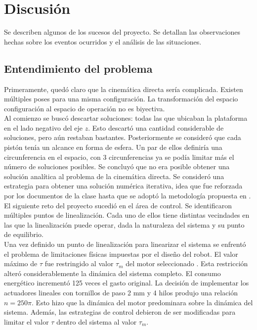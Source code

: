 \section{Discusión}
Se describen algunos de los sucesos del proyecto.
Se detallan las observaciones hechas sobre los eventos ocurridos y
el análisis de las situaciones.

\subsection{Entendimiento del problema}
Primeramente, quedó claro que la cinemática directa sería complicada. Existen múltiples poses para una misma configuración. 
La transformación del espacio configuración al espacio de operación no es biyectiva.\\

Al comienzo se buscó descartar soluciones: todas las que ubicaban la plataforma en el lado negativo del eje $z$. 
Esto descartó una cantidad considerable de soluciones, pero aún restaban bastantes.
Posteriormente se consideró que cada pistón tenía un alcance en forma de esfera.
Un par de ellos definiría una circunferencia en el espacio, con 3 circunferencias ya se podía limitar más el número de soluciones posibles.
Se concluyó que no era posible obtener una solución analítica al problema de la cinemática directa.
Se consideró una estrategia para obtener una solución numérica iterativa, idea que fue reforzada por los documentos de la clase hasta que se adoptó la metodología propuesta en  \cite{olguin2019}.\\

El siguiente reto del proyecto sucedió en el área de control.
Se identificaron múltiples puntos de linealización.
Cada uno de ellos tiene distintas vecindades en las que la linealización puede operar, dada la naturaleza del sistema y su punto de equilibrio.\\

Una vez definido un punto de linealización para linearizar el sistema
se enfrentó el problema de limitaciones físicas impuestas por el diseño del robot.
El valor máximo de $\tau$ fue restringido al valor $\tau_m$ del motor seleccionado \cite{motor}. Esta restricción alteró considerablemente la dinámica del sistema completo. El consumo energético incrementó 125 veces el gasto original.
La decisión de implementar los actuadores lineales con tornillos de paso 2 mm y 4 hilos produjo una relación $n = 250 \pi$.
Esto hizo que la dinámica del motor predominara sobre la dinámica del sistema. 
Además, las estrategias de control debieron de ser modificadas para limitar el valor $\tau$ dentro del sistema al valor $\tau_m$.


